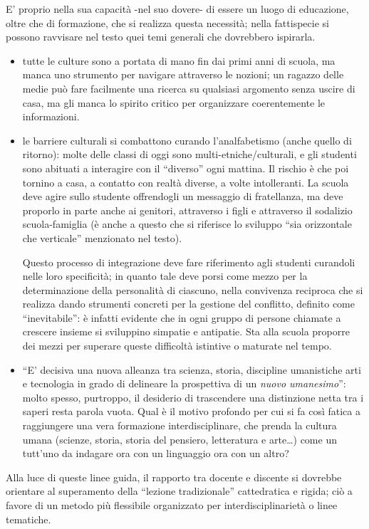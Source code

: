 \documentclass{article}
\begin{document}
E' proprio nella sua capacità -nel suo dovere- di essere un luogo di educazione, oltre che di formazione, che si realizza questa necessità; nella fattispecie si possono ravvisare nel testo quei temi generali che dovrebbero ispirarla.
\begin{itemize}
  \item tutte le culture sono a portata di mano fin dai primi anni di scuola, ma manca uno strumento per navigare attraverso le nozioni; un ragazzo delle medie può fare facilmente una ricerca su qualsiasi argomento senza uscire di casa, ma gli manca lo spirito critico per organizzare coerentemente le informazioni.
  \item le barriere culturali si combattono curando l'analfabetismo (anche quello di ritorno): molte delle classi di oggi sono multi-etniche\fshyp{}culturali, e gli studenti sono abituati a interagire con il ``diverso'' ogni mattina. Il rischio è che poi tornino a casa, a contatto con realtà diverse, a volte intolleranti. La scuola deve agire sullo studente offrendogli un messaggio di fratellanza, ma deve proporlo in parte anche ai genitori, attraverso i figli e attraverso il sodalizio scuola-famiglia (è anche a questo che si riferisce lo sviluppo ``sia orizzontale che verticale'' menzionato nel testo). 
  
  Questo processo di integrazione deve fare riferimento agli studenti curandoli nelle loro specificità; in quanto tale deve porsi come mezzo per la determinazione della personalità di ciascuno, nella convivenza reciproca che si realizza dando strumenti concreti per la gestione del conflitto, definito come ``inevitabile'': è infatti evidente che in ogni gruppo di persone chiamate a crescere insieme si sviluppino simpatie e antipatie. Sta alla scuola proporre dei mezzi per superare queste difficoltà istintive o maturate nel tempo.
  \item ``E' decisiva una nuova alleanza tra scienza, storia, discipline umanistiche arti e tecnologia in grado di delineare la prospettiva di un \emph{nuovo umanesimo}'': molto spesso, purtroppo, il desiderio di trascendere una distinzione netta tra i saperi resta parola vuota. Qual è il motivo profondo per cui si fa così fatica a raggiungere una vera formazione interdisciplinare, che prenda la cultura umana (scienze, storia, storia del pensiero, letteratura e arte\dots) come un tutt'uno da indagare ora con un linguaggio ora con un altro?
\end{itemize}
Alla luce di queste linee guida, il rapporto tra docente e discente si dovrebbe orientare al superamento della ``lezione tradizionale'' cattedratica e rigida; ciò a favore di un metodo più flessibile organizzato per interdisciplinarietà o linee tematiche. 
\end{document}
